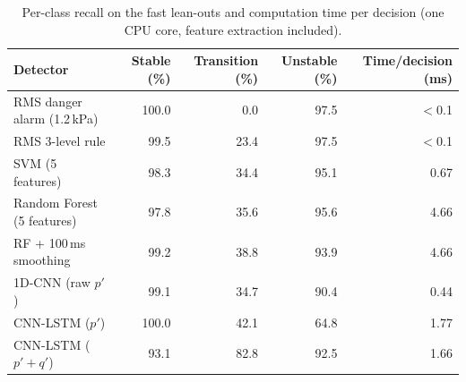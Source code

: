 \begin{table}[H]\centering\small
\caption{Per-class recall on the fast lean-outs and computation time per decision (one CPU core, feature extraction included).}\label{tab:latency}
\begin{tabular}{lrrrr}\toprule
Detector & Stable (\%) & Transition (\%) & Unstable (\%) & Time/decision (ms) \\\midrule
RMS danger alarm (1.2\,kPa) & 100.0 & 0.0 & 97.5 & $<$0.1 \\
RMS 3-level rule & 99.5 & 23.4 & 97.5 & $<$0.1 \\
SVM (5 features) & 98.3 & 34.4 & 95.1 & 0.67 \\
Random Forest (5 features) & 97.8 & 35.6 & 95.6 & 4.66 \\
RF + 100\,ms smoothing & 99.2 & 38.8 & 93.9 & 4.66 \\
1D-CNN (raw $p'$) & 99.1 & 34.7 & 90.4 & 0.44 \\
CNN-LSTM ($p'$) & 100.0 & 42.1 & 64.8 & 1.77 \\
CNN-LSTM ($p'+q'$) & 93.1 & 82.8 & 92.5 & 1.66 \\
\bottomrule\end{tabular}
\end{table}